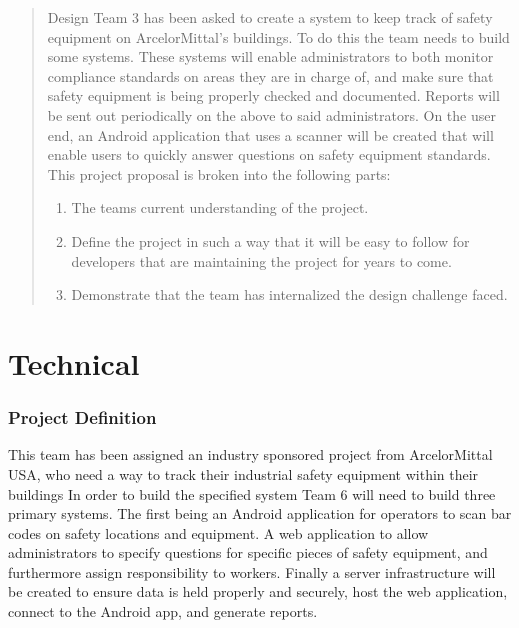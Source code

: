 \documentclass[Letter,11pt]{article}
\begin{document}
	
	\begin{abstract}
		Design Team 3 has been asked to create a system to keep track of safety equipment on ArcelorMittal's buildings. To do this the team needs to build some systems. These systems will enable administrators to both monitor compliance standards on areas they are in charge of, and make sure that safety equipment is being properly checked and documented. Reports will be sent out periodically on the above to said administrators.  On the user end, an Android application  that uses a scanner will be created that will enable users to quickly answer questions on safety equipment standards.  This project proposal is broken into the following parts:
		\begin{enumerate}
			\item The teams current understanding of the project.
			\item Define the project in such a way that it will be easy to follow for developers that are maintaining the project for years to come.
			\item Demonstrate that the team has internalized the design challenge faced.
		\end{enumerate}
	\end{abstract}
	
\part{Technical}
\section{Project Definition}\label{def}
	This team has been assigned an industry sponsored project from ArcelorMittal USA, who need a way to track their industrial safety equipment within their buildings In order to build the specified system Team 6 will need to build three primary systems. The first being an Android application for operators to scan bar codes on safety locations and equipment. A web application to allow administrators to specify questions for specific pieces of safety equipment, and furthermore assign responsibility to workers. Finally a server infrastructure will be created to ensure data is held properly and securely, host the web application, connect to the Android app, and generate reports. 
\end{document}
